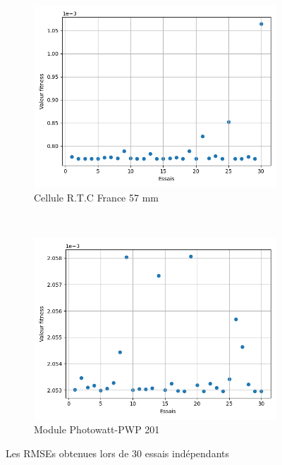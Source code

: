 \begin{figure}
    \centering
    \begin{subfigure}[b]{0.49\textwidth}
        \includegraphics[width=\textwidth]{resources/RTCFrance/singled/consist.png}
        \caption{Cellule R.T.C France 57 mm}
    \end{subfigure}
    ~
    \begin{subfigure}[b]{0.49\textwidth}
        \includegraphics[width=\textwidth]{resources/pwp/consistency.png}
        \caption{Module Photowatt-PWP 201}
    \end{subfigure}
    \caption{Les RMSEs obtenues lors de 30 essais indépendants}
    \label{fig:consist}
\end{figure}

